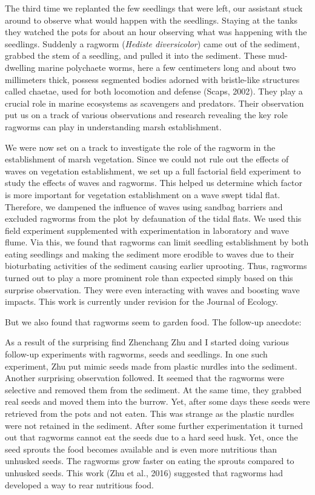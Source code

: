 \documentclass[authordate, empirical]{jote-new-article}
\begin{document}
	The third time we replanted the few seedlings that were left, our assistant stuck around to observe what would happen with the seedlings. Staying at the tanks they watched the pots for about an hour observing what was happening with the seedlings. Suddenly a ragworm (\emph{Hediste diversicolor}) came out of the sediment, grabbed the stem of a seedling, and pulled it into the sediment. These mud-dwelling marine polychaete worms, here a few centimeters long and about two millimeters thick, possess segmented bodies adorned with bristle-like structures called chaetae, used for both locomotion and defense (Scaps, 2002). They play a crucial role in marine ecosystems as scavengers and predators. Their observation put us on a track of various observations and research revealing the key role ragworms can play in understanding marsh establishment.



	We were now set on a track to investigate the role of the ragworm in the establishment of marsh vegetation. Since we could not rule out the effects of waves on vegetation establishment, we set up a full factorial field experiment to study the effects of waves and ragworms. This helped us determine which factor is more important for vegetation establishment on a wave swept tidal flat. Therefore, we dampened the influence of waves using sandbag barriers and excluded ragworms from the plot by defaunation of the tidal flats. We used this field experiment supplemented with experimentation in laboratory and wave flume. Via this, we found that ragworms can limit seedling establishment by both eating seedlings and making the sediment more erodible to waves due to their bioturbating activities of the sediment causing earlier uprooting. Thus, ragworms turned out to play a more prominent role than expected simply based on this surprise observation. They were even interacting with waves and boosting wave impacts. This work is currently under revision for the Journal of Ecology.



	But we also found that ragworms seem to garden food. The follow-up anecdote:



	As a result of the surprising find Zhenchang Zhu and I started doing various follow-up experiments with ragworms, seeds and seedlings. In one such experiment, Zhu put mimic seeds made from plastic nurdles into the sediment. Another surprising observation followed. It seemed that the ragworms were selective and removed them from the sediment. At the same time, they grabbed real seeds and moved them into the burrow. Yet, after some days these seeds were retrieved from the pots and not eaten. This was strange as the plastic nurdles were not retained in the sediment. After some further experimentation it turned out that ragworms cannot eat the seeds due to a hard seed husk. Yet, once the seed sprouts the food becomes available and is even more nutritious than unhusked seeds. The ragworms grow faster on eating the sprouts compared to unhusked seeds. This work (Zhu et al., 2016) suggested that ragworms had developed a way to rear nutritious food.
\end{document}
